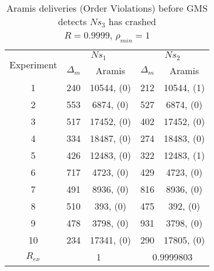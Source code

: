 \begin{table}[p]
    \begin{center}
        \renewcommand{\arraystretch}{1.25}
        \begin{tabular}{|c|c|c|c|c|}
            \hline
            \multirow{2}{*}{Experiment} & \multicolumn{2}{|c|}{$Ns_1$} & \multicolumn{2}{|c|}{$Ns_2$} \\ \cline{2-5}
                                                       & $\Delta_m$&\textsf{Aramis} & $\Delta_m$&\textsf{Aramis} \\ \hline \hline
            1 & 240 & 10544, (0) & 212 & 10544, (1) \\ \hline
            2 & 553 & 6874, (0) & 527 & 6874, (0) \\ \hline
            3 & 517 & 17452, (0) & 402 & 17452, (0) \\ \hline
            4 & 334 & 18487, (0) & 274 & 18483, (0) \\ \hline
            5 & 426 & 12483, (0) & 322 & 12483, (1) \\ \hline
            6 & 717 & 4723, (0) & 429 & 4723, (0) \\ \hline
            7 & 491 & 8936, (0) & 816 & 8936, (0) \\ \hline
            8 & 510 & 393, (0) & 475 & 392, (0) \\ \hline
            9 & 478 & 3798, (0) & 931 & 3798, (0) \\ \hline
            10 & 234 & 17341, (0) & 290 & 17805, (0) \\  \hline \hline
            $R_{ex}$ & \multicolumn{2}{|c|}{1} & \multicolumn{2}{|c|}{0.9999803} \\ \hline
        \end{tabular}
        \caption[\textsf{Aramis} deliveries before GMS detects node crash ($R=0.9999$, $\rho_{min}=1$)]{\textsf{Aramis} deliveries (Order Violations) before GMS detects $Ns_3$ has crashed \\ $R=0.9999$, $\rho_{min}=1$}
        \label{table:crashed_node_rho1}
    \end{center}
\end{table}

